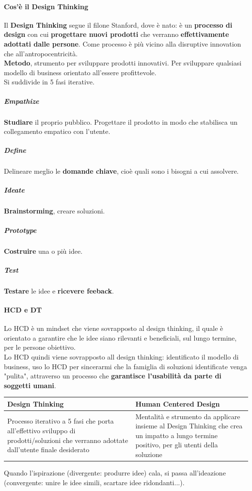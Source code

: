 \documentclass[10pt]{article}
\begin{document}
\paragraph{Cos'è il Design Thinking} Il \textbf{Design Thinking} segue il filone Stanford, dove è nato: è un \textbf{processo di design} con cui \textbf{progettare nuovi prodotti} che verranno \textbf{effettivamente adottati dalle persone}. Come processo è più vicino alla disruptive innovation che all'antropocentricità.\\
\textbf{Metodo}, strumento per sviluppare prodotti innovativi. Per sviluppare qualsiasi modello di business orientato all'essere profittevole.\\
Si suddivide in 5 fasi iterative.
\subparagraph{Empathize} \textbf{Studiare} il proprio pubblico. Progettare il prodotto in modo che stabilisca un collegamento empatico con l'utente.
\subparagraph{Define} Delineare meglio le \textbf{domande chiave}, cioè quali sono i bisogni a cui assolvere.
\subparagraph{Ideate} \textbf{Brainstorming}, creare soluzioni.
\subparagraph{Prototype} \textbf{Costruire} una o più idee.
\subparagraph{Test} \textbf{Testare} le idee e \textbf{ricevere feeback}.
\paragraph{HCD e DT} Lo HCD è un mindset che viene sovrapposto al design thinking, il quale è orientato a garantire che le idee siano rilevanti e beneficiali, sul lungo termine, per le persone obiettivo.\\
Lo HCD quindi viene sovrapposto all design thinking: identificato il modello di business, uso lo HCD per sincerarmi che la famiglia di soluzioni identificate venga "pulita", attraverso un processo che \textbf{garantisce l'usabilità da parte di soggetti umani}.\\
\begin{center}
\begin{tabular}{ m{8cm} | m{8cm} }
\textbf{Design Thinking} & \textbf{Human Centered Design}\\
\hline
Processo iterativo a 5 fasi che porta all'effettivo sviluppo di prodotti/soluzioni che verranno adottate dall'utente finale desiderato & Mentalità e strumento da applicare insieme al Design Thinking che crea un impatto a lungo termine positivo, per gli utenti della soluzione\\
\hline
\end{tabular}
\end{center}
Quando l'ispirazione (divergente: produrre idee) cala, si passa all'ideazione (convergente: unire le idee simili, scartare idee ridondanti...).
\end{document}
